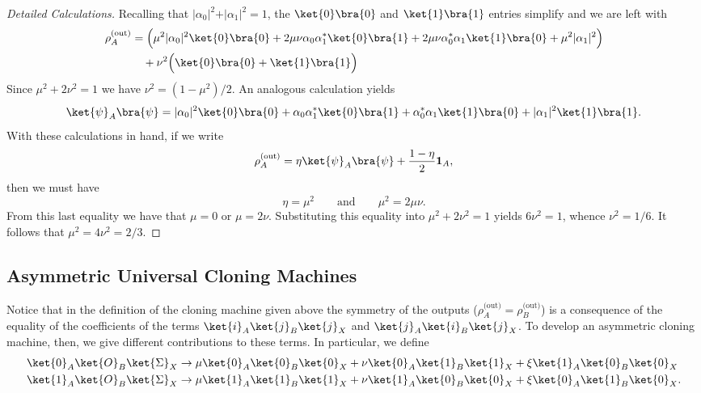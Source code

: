\documentclass[reqno]{amsart}
\numberwithin{lemma}{section}
\numberwithin{proposition}{section}
\begin{document}
\begin{proof}[Detailed Calculations]
	Recalling that $\vert \alpha_{0} \vert^{2} + \vert \alpha_{1} \vert^{2} = 1$, the $\ket{0}\bra{0}$ and $\ket{1}\bra{1}$ entries simplify and we are left with
	\begin{align*}
		\rho_{A}^{\textnormal{(out)}} &= \Big ( \mu^{2} \vert \alpha_{0} \vert^{2} \ket{0}\bra{0} + 2\mu \nu \alpha_{0} \alpha_{1}^{*} \ket{0}\bra{1} + 2\mu \nu \alpha_{0}^{*} \alpha_{1} \ket{1}\bra{0} + \mu^{2} \vert \alpha_{1} \vert^{2} \Big )\\
		&\quad  + \nu^{2} \Big ( \ket{0}\bra{0} + \ket{1}\bra{1} \Big )
	\end{align*}
	Since $\mu^{2} + 2\nu^{2} = 1$ we have $\nu^{2} = (1-\mu^{2})/2$. An analogous calculation yields
	\begin{equation*}
		\ket{\psi}_{A} \bra{\psi} = \vert \alpha_{0} \vert^{2} \ket{0}\bra{0} + \alpha_{0} \alpha_{1}^{*} \ket{0}\bra{1} + \alpha_{0}^{*} \alpha_{1} \ket{1}\bra{0} + \vert \alpha_{1} \vert^{2} \ket{1}\bra{1}.
	\end{equation*}
	With these calculations in hand, if we write 
	\begin{equation*}
		\rho_{A}^{\textnormal{(out)}} = \eta \ket{\psi}_{A} \bra{\psi} + \frac{1-\eta}{2} \mathbf{1}_{A},
	\end{equation*}
	then we must have
	\begin{equation*} 
		\eta = \mu^{2} \qquad \text{and} \qquad \mu^{2} = 2\mu \nu.
	\end{equation*}
	From this last equality we have that $\mu = 0$ or $\mu = 2 \nu$. Substituting this equality into $\mu^{2} + 2\nu^{2} = 1$ yields $6\nu^{2} = 1$, whence $\nu^{2} = 1/6$. It follows that $\mu^{2} = 4\nu^{2} = 2/3$. 

\end{proof}

\subsection{Asymmetric Universal Cloning Machines}
Notice that in the definition of the cloning machine given above the symmetry of the outputs ($\rho_{A}^{\text{(out)}} = \rho_{B}^{\text{(out)}}$) is a consequence of the equality of the coefficients of the terms $\ket{i}_{A} \ket{j}_{B} \ket{j}_{X}$ and $\ket{j}_{A} \ket{i}_{B} \ket{j}_{X}$. To develop an asymmetric cloning machine, then, we give different contributions to these terms. In particular, we define
\begin{align*}
    \ket{0}_{A} \ket{O}_{B} \ket{\Sigma}_{X} &\to \mu \ket{0}_{A} \ket{0}_{B} \ket{0}_{X} + \nu \ket{0}_{A} \ket{1}_{B} \ket{1}_{X} + \xi \ket{1}_{A} \ket{0}_{B} \ket{0}_{X}\\
    \ket{1}_{A} \ket{O}_{B} \ket{\Sigma}_{X} &\to \mu \ket{1}_{A} \ket{1}_{B} \ket{1}_{X} + \nu \ket{1}_{A} \ket{0}_{B} \ket{0}_{X} + \xi \ket{0}_{A} \ket{1}_{B} \ket{0}_{X}.
\end{align*}
\end{document}

